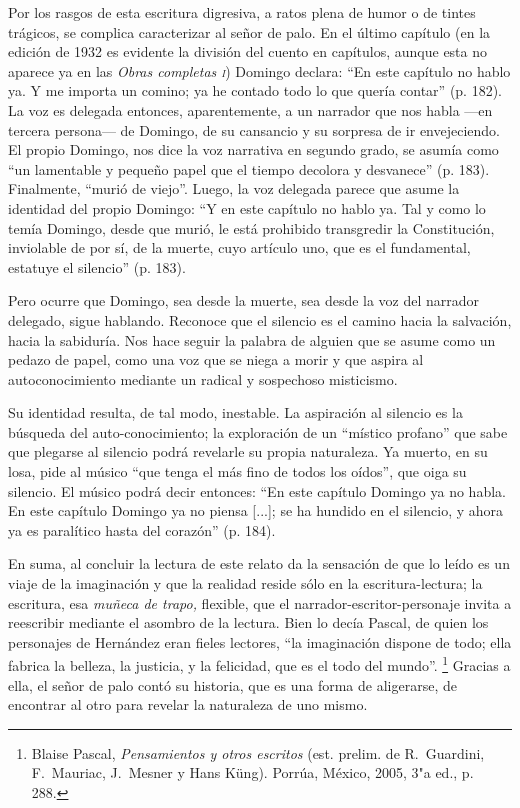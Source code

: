\documentclass[14pt,twoside,final]{extbook} %
\let\oldfootnote\footnote
\renewcommand\footnote[1]{%
\oldfootnote{\hspace{1mm}#1}}
\begin{document}
Por los rasgos de esta escritura digresiva, a ratos plena de humor o de tintes trágicos, se complica caracterizar al señor de palo. En el último capítulo (en la edición de 1932 es evidente la división del cuento en capítulos, aunque esta no aparece ya en las \emph{Obras completas \textsc{i}}) Domingo declara: ``En este capítulo no hablo ya. Y me importa un comino; ya he contado todo lo que quería contar'' (p. 182). La voz es delegada entonces, aparentemente, a un narrador que nos habla ---en tercera persona--- de Domingo, de su cansancio y su sorpresa de ir envejeciendo. El propio Domingo, nos dice la voz narrativa en segundo grado, se asumía como ``un lamentable y pequeño papel que el tiempo decolora y desvanece'' (p. 183). Finalmente, ``murió de viejo''. Luego, la voz delegada parece que asume la identidad del propio Domingo: ``Y en este capítulo no hablo ya. Tal y como lo temía Domingo, desde que murió, le está prohibido transgredir la Constitución, inviolable de por sí, de la muerte, cuyo artículo uno, que es el fundamental, estatuye el silencio'' (p. 183).

Pero ocurre que Domingo, sea desde la muerte, sea desde la voz del narrador delegado, sigue hablando. Reconoce que el silencio es el camino hacia la salvación, hacia la sabiduría. Nos hace seguir la palabra de alguien que se asume como un pedazo de papel, como una voz que se niega a morir y que aspira al autoconocimiento mediante un radical y sospechoso misticismo.

Su identidad resulta, de tal modo, inestable. La aspiración al silencio es la búsqueda del auto-conocimiento; la exploración de un ``místico profano'' que sabe que plegarse al silencio podrá revelarle su propia naturaleza. Ya muerto, en su losa, pide al músico ``que tenga el más fino de todos los oídos'', que oiga su silencio. El músico podrá decir entonces: ``En este capítulo Domingo ya no habla. En este capítulo Domingo ya no piensa [...]; se ha hundido en el silencio, y ahora ya es
paralítico hasta del corazón'' (p. 184).

En suma, al concluir la lectura de este relato da la sensación de que lo leído es un viaje de la imaginación y que la realidad reside sólo en la escritura-lectura; la escritura, esa \emph{muñeca de trapo,} flexible, que el narrador-escritor-personaje invita a reescribir mediante el asombro de la lectura. Bien lo decía Pascal, de quien los personajes de Hernández eran fieles lectores, ``la imaginación dispone de todo; ella fabrica la belleza, la justicia, y la felicidad, que es el todo del mundo''.\footnote{Blaise Pascal, \emph{Pensamientos y otros escritos} (est. prelim. de R.~Guardini, F.~Mauriac, J.~Mesner y Hans Küng). Porrúa, México, 2005, 3"a ed., p. 288.} Gracias a ella, el señor de palo contó su historia, que es una forma de aligerarse, de encontrar al otro para revelar la naturaleza de uno mismo.
\end{document}
